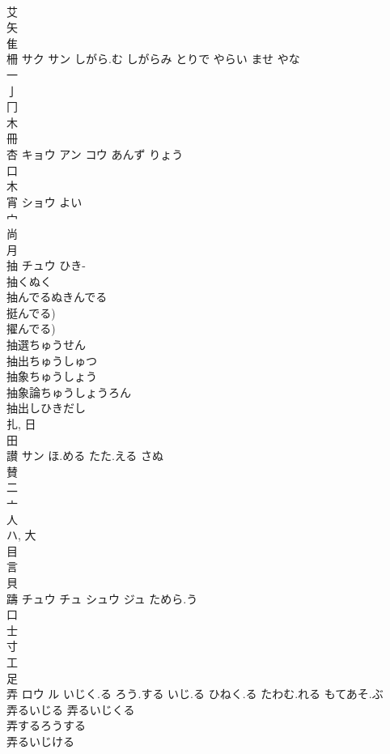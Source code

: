 \documentclass[8pt]{extreport}
\begin{document}
\begin{CJK}{UTF8}{min}
\\	艾 
\\	矢 
\\	隹 
\\	柵	サク サン	しがら.む しがらみ とりで やらい ませ やな	
\\	一 
\\	亅 
\\	冂 
\\	木 
\\	冊 
\\	杏	キョウ アン コウ	あんず りょう	
\\	口 
\\	木 
\\	宵	ショウ	よい	
\\	宀 
\\	尚 
\\	月 
\\	抽	チュウ	ひき-	
\\	抽くぬく
\\	抽んでるぬきんでる
\\	挺んでる) 
\\	擢んでる) 
\\	抽選ちゅうせん
\\	抽出ちゅうしゅつ
\\	抽象ちゅうしょう
\\	抽象論ちゅうしょうろん
\\	抽出しひきだし
\\	扎, 日 
\\	田 
\\	讃	サン	ほ.める たた.える さぬ	
\\	賛 
\\	二 
\\	亠 
\\	人 
\\	ハ, 大 
\\	目 
\\	言 
\\	貝 
\\	躊	チュウ チュ シュウ ジュ	ためら.う	
\\	口 
\\	士 
\\	寸 
\\	工 
\\	足 
\\	弄	ロウ ル	いじく.る ろう.する いじ.る ひねく.る たわむ.れる もてあそ.ぶ	
\\	弄るいじる 弄るいじくる 
\\	弄するろうする 
\\	弄るいじける 

\end{CJK}
\end{document}
